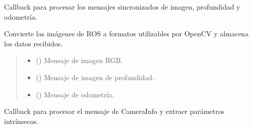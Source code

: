 \documentclass[a4paper,10pt,spanish]{sphinxmanual}
\begin{document}
\begin{fulllineitems}

\begin{fulllineitems}
\label{\detokenize{squad_object_detection_action:squad_object_detection_action.TurtleBotObjectDetectionAction.callback}}
\pysigstartsignatures
{}
\pysigstopsignatures
\sphinxAtStartPar
Callback para procesar los mensajes sincronizados de imagen, profundidad y odometría.

\sphinxAtStartPar
Convierte las imágenes de ROS a formatos utilizables por OpenCV y almacena los datos recibidos.
\begin{quote}\begin{description}
\begin{itemize}
\item {} 
\sphinxAtStartPar
{} () \textendash{} Mensaje de imagen RGB.

\item {} 
\sphinxAtStartPar
{} () \textendash{} Mensaje de imagen de profundidad.

\item {} 
\sphinxAtStartPar
{} () \textendash{} Mensaje de odometría.

\end{itemize}

\end{description}\end{quote}

\end{fulllineitems}


\begin{fulllineitems}
\label{\detokenize{squad_object_detection_action:squad_object_detection_action.TurtleBotObjectDetectionAction.camera_info_callback}}
\pysigstartsignatures
{}
\pysigstopsignatures
\sphinxAtStartPar
Callback para procesar el mensaje de CameraInfo y extraer parámetros intrínsecos.


\end{fulllineitems}
\end{fulllineitems}
\end{document}
